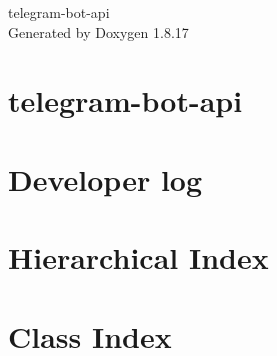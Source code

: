 \let\mypdfximage\pdfximage\def\pdfximage{\immediate\mypdfximage}\documentclass[twoside]{book}
\newcommand{\+}{\discretionary{\mbox{\scriptsize$\hookleftarrow$}}{}{}}
\newcommand{\clearemptydoublepage}{%
  \newpage{\pagestyle{empty}\cleardoublepage}%
}
\begin{document}
\hypersetup{pageanchor=false,
             bookmarksnumbered=true,
             pdfencoding=unicode
            }
\begin{titlepage}
\vspace*{7cm}
\begin{center}%
{\Large telegram-\/bot-\/api }\\
\vspace*{1cm}
{\large Generated by Doxygen 1.8.17}\\
\end{center}
\end{titlepage}
\clearemptydoublepage
{}
\tableofcontents
\clearemptydoublepage
{}
\hypersetup{pageanchor=true}

\chapter{telegram-\/bot-\/api}
\label{index}\hypertarget{index}{}
\chapter{Developer log}
\label{dev-log}

\chapter{Hierarchical Index}

\chapter{Class Index}

\end{document}
